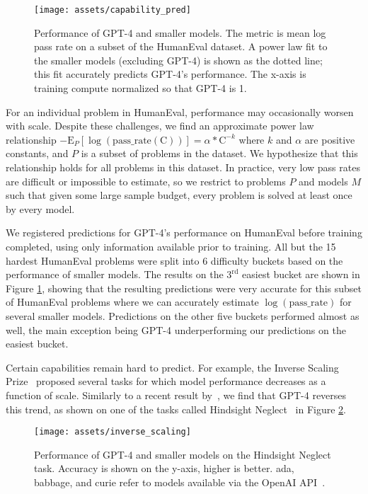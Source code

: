 \documentclass{article}
\begin{document}
\begin{figure}[htbp]
    \centering
    \texttt{[image: assets/capability\_pred]}
    \caption{Performance of GPT-4 and smaller models. The metric is mean log pass rate on a subset of the HumanEval dataset. A power law fit to the smaller models (excluding GPT-4) is shown as the dotted line; this fit accurately predicts GPT-4's performance. The x-axis is training compute normalized so that GPT-4 is 1. 
    }
    \label{fig:predictable_scaling_humaneval}
\end{figure}


For an individual problem in HumanEval, performance may occasionally worsen with scale. Despite these challenges, we find an approximate power law relationship $-\mathrm{E}_{P}[\log(\mathrm{pass\_rate(C)})] = \alpha*\mathrm{C}^{-k}$ where $k$ and $\alpha$ are positive constants, and $P$ is a subset of problems in the dataset.  We hypothesize that this relationship holds for all problems in this dataset.  In practice, very low pass rates are difficult or impossible to estimate, so we restrict to problems $P$ and models $M$ such that given some large sample budget, every problem is solved at least once by every model.

We registered predictions for GPT-4’s performance on HumanEval before training completed, using only information available prior to training.  All but the 15 hardest HumanEval problems were split into 6 difficulty buckets based on the performance of smaller models.  The results on the $3^\mathrm{rd}$ easiest bucket are shown in Figure \ref{fig:predictable_scaling_humaneval}, showing that the resulting predictions were very accurate for this subset of HumanEval problems where we can accurately estimate $\log(\mathrm{pass\_rate})$ for several smaller models. Predictions on the other five buckets performed almost as well, the main exception being GPT-4 underperforming our predictions on the easiest bucket.

Certain capabilities remain hard to predict. For example, the Inverse
Scaling Prize~\citep{mckenzie2022inverse} proposed several tasks for which model performance decreases as a function of scale. Similarly to a recent result by~\citet{wei2022inverse}, we find that GPT-4 reverses this trend, as shown on one of the tasks called Hindsight Neglect~\citep{mckenzie2022round1} in Figure \ref{fig:inverse_scaling}.

\begin{figure}[htbp]
    \centering
    \texttt{[image: assets/inverse\_scaling]}
    \caption{Performance of GPT-4 and smaller models on the Hindsight Neglect task. Accuracy is shown on the y-axis, higher is better. ada, babbage, and curie refer to models available via the OpenAI API~\cite{openaiapiblog}.}
    \label{fig:inverse_scaling}
\end{figure}
\end{document}
